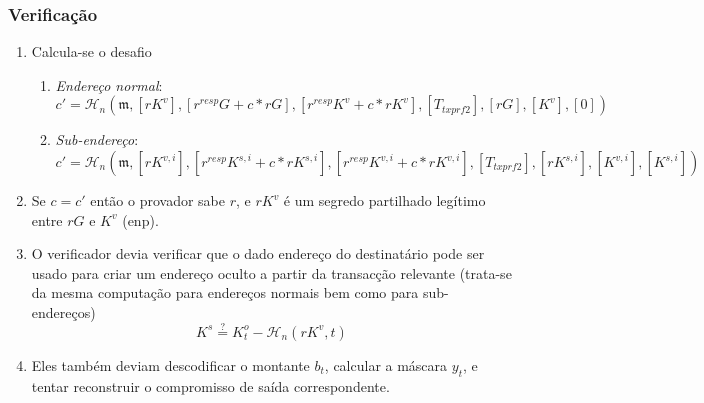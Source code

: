 \subsubsection*{Verificação}

\begin{enumerate}
    \item Calcula-se o desafio
    \begin{enumerate}
        \item {\em Endereço normal}:\vspace{.145cm}
	    \[c' = \mathcal{H}_n(\mathfrak{m},[rK^v], [r^{resp} G + c*r G], [r^{resp} K^v + c*r K^v], [T_{txprf2}], [rG], [K^v], [0])\]
	    \item {\em Sub-endereço}:\vspace{.16cm}
	    \[c' = \mathcal{H}_n(\mathfrak{m},[rK^{v,i}], [r^{resp} K^{s,i} + c*r K^{s,i}], [r^{resp} K^{v,i} + c*r K^{v,i}], [T_{txprf2}], [rK^{s,i}], [K^{v,i}], [K^{s,i}])\]
    \end{enumerate}{}
    \item Se $c = c'$ então o provador sabe $r$, e $rK^v$ é um segredo partilhado legítimo entre $r G$ e $K^v$ (enp).    
    \item O verificador devia verificar que o dado endereço do destinatário pode ser usado para criar um endereço oculto a partir da transacção relevante (trata-se da mesma computação para endereços normais bem como para sub-endereços)   
    \[K^s \stackrel{?}{=} K^o_t - \mathcal{H}_n(r K^v,t)\]
    \item Eles também deviam descodificar o montante $b_t$, calcular a máscara $y_t$, e tentar reconstruir o compromisso de saída correspondente. 

\end{enumerate}
